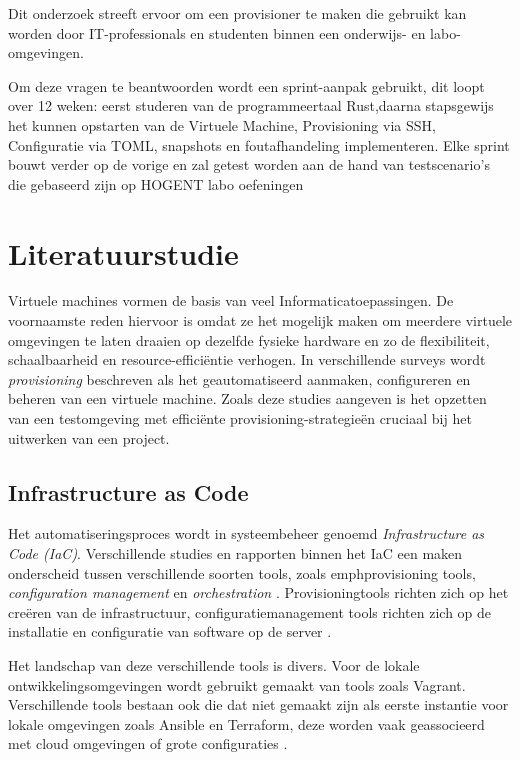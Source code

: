 Dit onderzoek streeft ervoor om een provisioner te maken die gebruikt kan worden door IT-professionals en studenten binnen een onderwijs- en labo-omgevingen. 

Om deze vragen te beantwoorden wordt een  sprint-aanpak gebruikt, dit loopt over 12 weken: eerst studeren van de programmeertaal Rust,daarna stapsgewijs het kunnen opstarten van de Virtuele Machine, Provisioning via SSH, Configuratie via TOML, snapshots en foutafhandeling implementeren. Elke sprint bouwt verder op de vorige en zal getest worden aan de hand van testscenario's die gebaseerd zijn op HOGENT labo oefeningen


\section{Literatuurstudie}%
\label{sec:literatuurstudie}


Virtuele machines vormen de basis van veel Informaticatoepassingen. De voornaamste reden hiervoor is omdat ze het mogelijk maken om meerdere virtuele omgevingen te laten draaien op dezelfde fysieke hardware en zo de flexibiliteit, schaalbaarheid en resource-efficiëntie verhogen\autocite{Ahmed2020}. In verschillende surveys wordt \emph{provisioning} beschreven als het geautomatiseerd aanmaken, configureren en beheren van een virtuele machine\autocite{Kirana2018,Abdulhamid2014}. Zoals deze studies aangeven is het opzetten van een testomgeving met efficiënte provisioning-strategieën cruciaal bij het uitwerken van een project.




\subsection {Infrastructure as Code}
Het automatiseringsproces wordt in systeembeheer genoemd \emph{Infrastructure as Code (IaC)}. Verschillende studies en rapporten binnen het IaC een maken onderscheid tussen verschillende soorten tools, zoals emph{provisioning tools}, \emph{configuration management} en \emph{orchestration} \autocite{Hill2015,Yevgeniy2025}. Provisioningtools  richten zich op het creëren van de infrastructuur, configuratiemanagement tools richten zich op de installatie en configuratie van software op de server \autocite{Ijaz2024}. 

Het landschap van deze verschillende tools is divers. Voor de lokale ontwikkelingsomgevingen wordt gebruikt gemaakt van tools zoals Vagrant. Verschillende tools bestaan ook die dat niet gemaakt zijn als eerste instantie voor lokale omgevingen zoals Ansible en Terraform, deze worden vaak geassocieerd met cloud omgevingen of grote configuraties \autocite{Ismailzai2017}.


